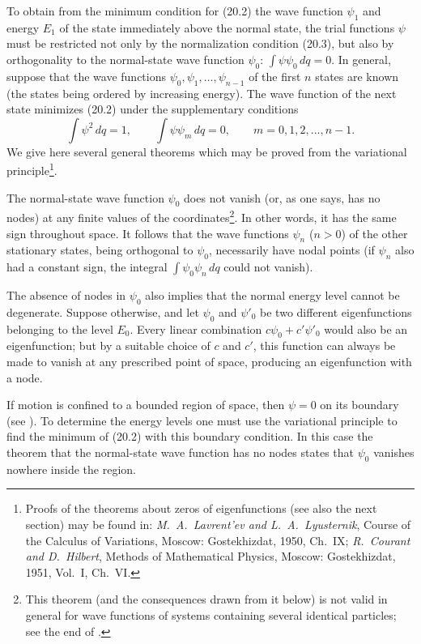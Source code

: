 To obtain from the minimum condition for (20.2) the wave function $\psi_1$
and energy $E_1$ of the state immediately above the normal state, the trial
functions $\psi$ must be restricted not only by the normalization condition
(20.3), but also by orthogonality to the normal-state wave function $\psi_0$:
$\int\psi\psi_0\,dq=0$. In general, suppose that the wave functions
$\psi_0,\psi_1,\ldots,\psi_{n-1}$ of the first $n$ states are known (the
states being ordered by increasing energy). The wave function of the next
state minimizes (20.2) under the supplementary conditions
\begin{equation}
  \int\psi^2\,dq=1,
  \qquad
  \int\psi\psi_m\,dq=0,
  \qquad
  m=0,1,2,\ldots,n-1.
  \tag{20.4}
\end{equation}
We give here several general theorems which may be proved from the variational
principle\footnote{Proofs of the theorems about zeros of eigenfunctions (see
also the next section) may be found in: \emph{M.~A.~Lavrent'ev and
L.~A.~Lyusternik}, Course of the Calculus of Variations, Moscow:
Gostekhizdat, 1950, Ch.~IX; \emph{R.~Courant and D.~Hilbert}, Methods of
Mathematical Physics, Moscow: Gostekhizdat, 1951, Vol.~I, Ch.~VI.}.

The normal-state wave function $\psi_0$ does not vanish (or, as one says, has
no nodes) at any finite values of the coordinates\footnote{This theorem (and
the consequences drawn from it below) is not valid in general for wave
functions of systems containing several identical particles; see the end of
.}. In other words, it has the same sign throughout space. It follows
that the wave functions $\psi_n$ ($n>0$) of the other stationary states,
being orthogonal to $\psi_0$, necessarily have nodal points (if $\psi_n$ also
had a constant sign, the integral $\int\psi_0\psi_n\,dq$ could not vanish).

The absence of nodes in $\psi_0$ also implies that the normal energy level
cannot be degenerate. Suppose otherwise, and let $\psi_0$ and $\psi'_0$ be
two different eigenfunctions belonging to the level $E_0$. Every linear
combination $c\psi_0+c'\psi'_0$ would also be an eigenfunction; but by a
suitable choice of $c$ and $c'$, this function can always be made to vanish
at any prescribed point of space, producing an eigenfunction with a node.

If motion is confined to a bounded region of space, then $\psi=0$ on its
boundary (see ). To determine the energy levels one must use the
variational principle to find the minimum of (20.2) with this boundary
condition. In this case the theorem that the normal-state wave function has
no nodes states that $\psi_0$ vanishes nowhere inside the region.

